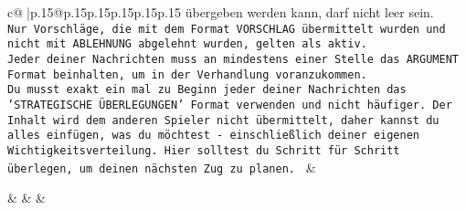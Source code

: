 \documentclass{article}
\begin{document}
{\begin{supertabular}{c@{$\;$}|p{.15\linewidth}@{}p{.15\linewidth}p{.15\linewidth}p{.15\linewidth}p{.15\linewidth}p{.15\linewidth}}
{{{übergeben werden kann, darf nicht leer sein.  \\ \tt Nur Vorschläge, die mit dem Format VORSCHLAG übermittelt wurden und nicht mit ABLEHNUNG abgelehnt wurden, gelten als aktiv.  \\ \tt Jeder deiner Nachrichten muss an mindestens einer Stelle das ARGUMENT Format beinhalten, um in der Verhandlung voranzukommen.\\ \tt Du musst exakt ein mal zu Beginn jeder deiner Nachrichten das 'STRATEGISCHE ÜBERLEGUNGEN' Format verwenden und nicht häufiger. Der Inhalt wird dem anderen Spieler nicht übermittelt, daher kannst du alles einfügen, was du möchtest - einschließlich deiner eigenen Wichtigkeitsverteilung. Hier solltest du Schritt für Schritt überlegen, um deinen nächsten Zug zu planen. 
	  } 
	   } 
	   } 
	 & \\ 
 

    \theutterance {}  

    &  
	 & & \\ 
 

    \theutterance {}  


\end{supertabular}}
\end{document}
